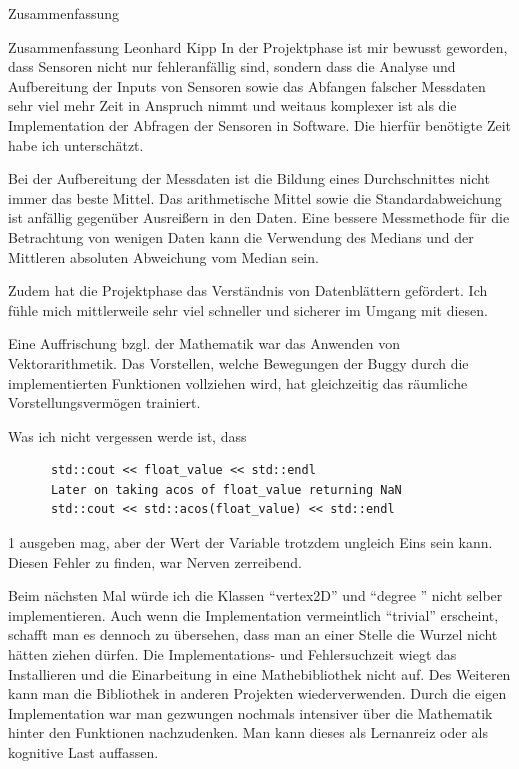 \documentclass[12pt]{report}
\begin{document}
\begin{section}{Zusammenfassung}
  \begin{subsection}{Zusammenfassung Leonhard Kipp}
    In der Projektphase ist mir bewusst geworden, dass Sensoren nicht nur
    fehleranfällig sind, sondern dass die Analyse und Aufbereitung der Inputs
    von Sensoren sowie das Abfangen falscher Messdaten sehr viel mehr Zeit in Anspruch nimmt und weitaus komplexer
    ist als die Implementation der Abfragen der Sensoren in Software. Die
    hierfür benötigte Zeit habe ich unterschätzt.
    
    Bei der Aufbereitung der Messdaten ist die Bildung eines Durchschnittes nicht
    immer das beste Mittel. Das arithmetische Mittel sowie die
    Standardabweichung ist anfällig gegenüber Ausreißern
    in den Daten. Eine bessere Messmethode für die Betrachtung von wenigen Daten
    kann die Verwendung des Medians und der Mittleren absoluten Abweichung vom
    Median sein.

    Zudem hat die Projektphase das Verständnis von Datenblättern gefördert. Ich
    fühle mich mittlerweile sehr viel schneller und sicherer im Umgang mit diesen.

    Eine Auffrischung bzgl. der Mathematik war das Anwenden von Vektorarithmetik. Das Vorstellen,
    welche Bewegungen der Buggy durch die implementierten Funktionen vollziehen
    wird, hat gleichzeitig das räumliche Vorstellungsvermögen trainiert.

    Was ich nicht vergessen werde ist, dass
    \begin{lstlisting}
      std::cout << float_value << std::endl
      Later on taking acos of float_value returning NaN
      std::cout << std::acos(float_value) << std::endl
    \end{lstlisting}
    1 ausgeben mag, aber der Wert der Variable trotzdem ungleich Eins sein kann.
    Diesen Fehler zu finden, war Nerven zerreibend.

    Beim nächsten Mal würde ich die Klassen "`vertex2D"' und "`degree "' nicht
    selber implementieren. Auch wenn die Implementation vermeintlich "`trivial"'
    erscheint, schafft man es dennoch zu übersehen, dass man an einer Stelle die
    Wurzel nicht hätten ziehen dürfen. Die Implementations- und Fehlersuchzeit
    wiegt das Installieren und die Einarbeitung in eine Mathebibliothek nicht
    auf. Des Weiteren kann man die Bibliothek in anderen Projekten
    wiederverwenden.
    Durch die eigen Implementation war man gezwungen nochmals
    intensiver über die Mathematik hinter den Funktionen nachzudenken. Man kann
    dieses als Lernanreiz oder als kognitive Last auffassen.


\end{subsection}
\end{section}
\end{document}
